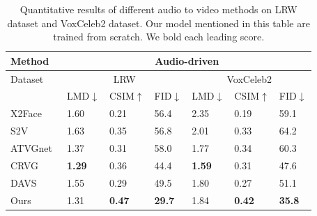 \documentclass[runningheads]{llncs}
\begin{document}
\begin{table}[t]
    \centering
  \begin{tabular*}{0.7\linewidth}{  p{1.9cm} p{1.0cm} p{1.0cm} p{1.0cm}|p{1.0cm} p{1.0cm} p{1.0cm} }
      \toprule
      \toprule
Method & \multicolumn{6}{c}{Audio-driven}   \\ \hline

Dataset & \multicolumn{3}{c}{LRW} & \multicolumn{3}{c}{VoxCeleb2}   \\
      \midrule
& {LMD$\downarrow$} & {CSIM$\uparrow$} & {FID$\downarrow$} & {LMD$\downarrow$} & {CSIM$\uparrow$} & {FID$\downarrow$}  \\

\hline
{X2Face~\cite{wiles2018x2face}} & 1.60& 0.21& 56.4 & 2.35  & 0.19  & 59.1\\
 \hline
 {S2V~\cite{chung2017you}}& 1.63 & 0.35 & 56.8 & 2.01  & 0.33  & 64.2    \\ \hline

 {ATVGnet~\cite{chen2019hierarchical}}  & 1.37 & 0.31 & 58.0  &1.77  & 0.34 & 60.3 \\    \hline
  {CRVG~\cite{ijcai2019-129}}  & \textbf{1.29} & 0.36 & 44.4 & \textbf{1.59}   & 0.31 & 47.6 \\    \hline

  {DAVS~\cite{zhou2019talking}}  & 1.55 & 0.29 & 49.5 & 1.80   & 0.27  & 51.1\\    \hline
    \bottomrule
  { Ours } & 1.31  & \textbf{0.47 }& \textbf{29.7}& 1.84  &\textbf{0.42 } &\textbf{35.8 }\\ \hline
      \bottomrule
  \end{tabular*}
  \caption{Quantitative results of different audio to video methods on LRW dataset and VoxCeleb2 dataset. Our model mentioned in this table are trained from scratch. We bold each leading score.}
    \label{tab:audio_tb}
\end{table}
\end{document}
